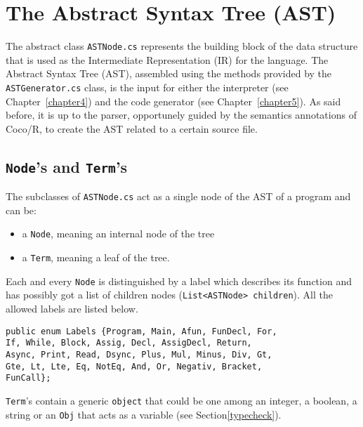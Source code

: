 \chapter{\label{chapter3} The Abstract Syntax Tree (AST)}

The abstract class \texttt{ASTNode.cs} represents the building block of the data structure that is used as the Intermediate Representation (IR) for the \fwap language. The Abstract Syntax Tree (AST), assembled using the methods provided by the \texttt{ASTGenerator.cs} class, is the input for either the interpreter (see Chapter~\ref{chapter4}) and the \fsharp code generator (see Chapter~\ref{chapter5}). As said before, it is up to the parser, opportunely guided by the semantics annotations of Coco/R, to create the AST related to a certain \fwap source file.

\section{\texttt{Node}'s and \texttt{Term}'s}

The subclasses of \texttt{ASTNode.cs} act as a single node of the AST of a program and can be:
\begin{itemize}
	\item a \texttt{Node}, meaning an internal node of the tree 
	\item a \texttt{Term}, meaning a leaf of the tree.
\end{itemize}

Each and every \texttt{Node} is distinguished by a label which describes its function and has possibly got a list of children nodes (\texttt{List<ASTNode> children}). All the allowed labels are listed below.\\

\begin{lstlisting}[caption=Labels for \texttt{Node}s.]
public enum Labels {Program, Main, Afun, FunDecl, For,
If, While, Block, Assig, Decl, AssigDecl, Return, 
Async, Print, Read, Dsync, Plus, Mul, Minus, Div, Gt,
Gte, Lt, Lte, Eq, NotEq, And, Or, Negativ, Bracket, 
FunCall};
\end{lstlisting}

\texttt{Term}'s contain a generic \texttt{object} that could be one among an integer, a boolean, a string or an \texttt{Obj} that acts as a variable (see Section\ref{typecheck}).
